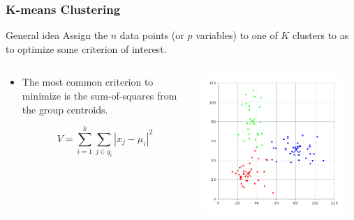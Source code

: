 \documentclass{beamer}
\begin{document}
\begin{frame}
\frametitle{K-means Clustering}

\begin{block}{General idea}
Assign the $n$ data points (or $p$ variables) to one of $K$ clusters to as to optimize some criterion of interest.    
\end{block}

\begin{columns}
    
\begin{column}{5cm}
\begin{itemize}
\item The most common criterion to minimize is the sum-of-squares from the group centroids.

\[
V = \sum_{i=1}^k \sum_{j \in g_i}|x_j-\mu_i|^2
\]
\end{itemize}
\end{column}

\begin{column}{5.5cm}
\begin{center}
\includegraphics[width=0.9\textwidth]{k-means-simple.png}    
\end{center}
\end{column}

\end{columns}


\end{frame}
\end{document}
